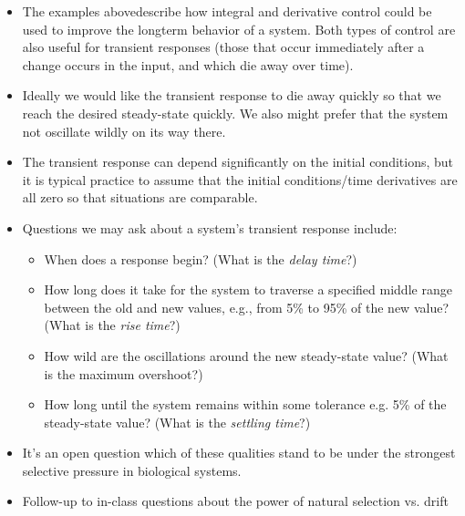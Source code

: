 \documentclass{article}
\begin{document}
\begin{itemize}

\item The examples abovedescribe how integral and derivative control could be used to improve the longterm behavior of a system. Both types of control are also useful for transient responses (those that occur immediately after a change occurs in the input, and which die away over time).

\item Ideally we would like the transient response to die away quickly so that we reach the desired steady-state quickly. We also might prefer that the system not oscillate wildly on its way there.

\item The transient response can depend significantly on the initial conditions, but it is typical practice to assume that the initial conditions/time derivatives are all zero so that situations are comparable.

\item Questions we may ask about a system's transient response include:
\begin{itemize}
\item When does a response begin? (What is the \textit{delay time}?)
\item How long does it take for the system to traverse a specified middle range between the old and new values, e.g., from 5\% to 95\% of the new value? (What is the \textit{rise time}?)
\item How wild are the oscillations around the new steady-state value? (What is the maximum overshoot?)
\item How long until the system remains within some tolerance e.g. 5\% of the steady-state value? (What is the \textit{settling time}?)
\end{itemize}

\item It's an open question which of these qualities stand to be under the strongest selective pressure in biological systems.

\item Follow-up to in-class questions about the power of natural selection vs. drift


\end{itemize}
\end{document}
